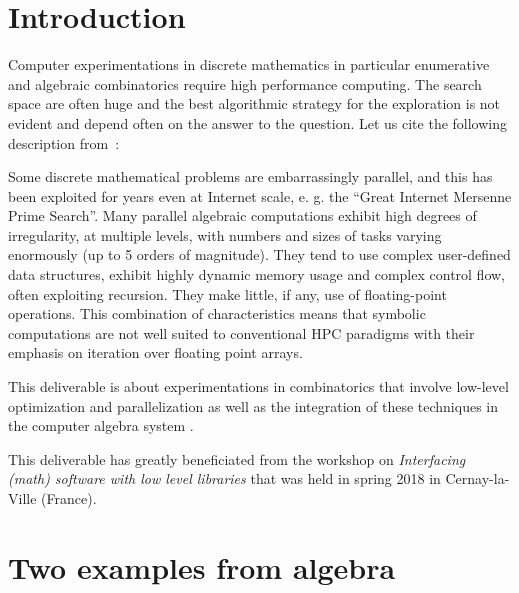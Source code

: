 \documentclass{deliverablereport}
\author{V. Delecroix, F. Hivert}
\begin{document}
\maketitle

\tableofcontents


\section{Introduction}

Computer experimentations in discrete mathematics in particular
enumerative and algebraic combinatorics require high performance
computing. The search space are often huge and the best algorithmic
strategy for the exploration is not evident and depend often on
the answer to the question. Let us cite the following description
from~\cite{LoidlTrinder-Hecke}:
\begin{citation}{}
  Some discrete mathematical problems are embarrassingly parallel, and this
  has been exploited for years even at Internet scale, e. g. the “Great
  Internet Mersenne Prime Search”.  Many parallel algebraic computations
  exhibit high degrees of irregularity, at multiple levels, with numbers and
  sizes of tasks varying enormously (up to 5 orders of magnitude). They tend
  to use complex user-defined data structures, exhibit highly dynamic memory
  usage and complex control flow, often exploiting recursion. They make
  little, if any, use of floating-point operations.  This combination of
  characteristics means that symbolic computations are not well suited to
  conventional HPC paradigms with their emphasis on iteration over floating
  point arrays.
\end{citation}

This deliverable is about experimentations in combinatorics
that involve low-level optimization and parallelization as
well as the integration of these techniques in the computer
algebra system \Sage.

This deliverable has greatly beneficiated from the \ODK workshop
on \textit{Interfacing (math) software with low level libraries}
that was held in spring 2018 in Cernay-la-Ville (France).


\section{Two examples from algebra}
\end{document}
